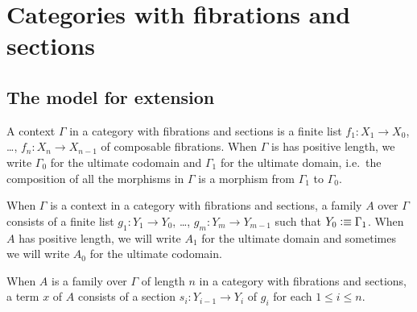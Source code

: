 \section{Categories with fibrations and sections}

\subsection{The  model for extension}


\begin{defn}
A context $\Gamma$ in a category with fibrations and sections is a finite list $f_1:X_1\to X_0$, \dots, $f_n:X_n\to X_{n-1}$ of composable fibrations. When $\Gamma$ is has positive length, we write $\Gamma_0$ for the ultimate codomain and $\Gamma_1$ for the ultimate domain, i.e.~the composition of all the morphisms in
$\Gamma$ is a morphism from $\Gamma_1$ to $\Gamma_0$. 
\end{defn}

\begin{defn}
When $\Gamma$ is a context in a category with fibrations and sections, a family $A$ over $\Gamma$ consists of a finite list $g_1:Y_1\to Y_0$, \dots, $g_m:Y_m\to Y_{m-1}$ such that $Y_0\vcentcolon\equiv \Gamma_1$. When $A$ has positive length, we will write $A_1$ for the ultimate domain and sometimes we will write $A_0$ for the ultimate codomain.
\end{defn}

\begin{defn}
When $A$ is a family over $\Gamma$ of length $n$ in a category with fibrations and sections, a term $x$ of $A$ consists of a section $s_i:Y_{i-1}\to Y_i$ of $g_i$ for each $1\leq i\leq n$. 
\end{defn}


